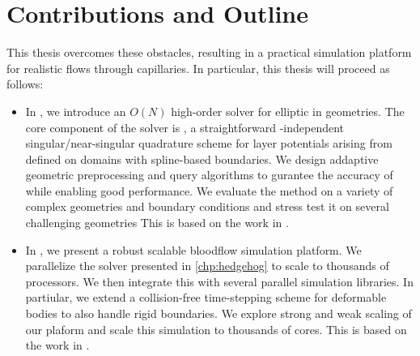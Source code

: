\section{Contributions and Outline}
This thesis overcomes these obstacles, resulting in a practical simulation platform for realistic \rbc flows through capillaries.
In particular, this thesis will proceed as follows:
\begin{itemize}
    \item In , we introduce an $O(N)$ high-order solver for elliptic \pdes in \threed geometries.
        The core component of the solver is \qbkix, a straightforward \pde-independent singular/near-singular quadrature scheme for layer potentials arising from \pdes defined on domains with spline-based boundaries.
        We design addaptive geometric preprocessing and query algorithms to gurantee the accuracy of \qbkix while enabling good performance. 
        We evaluate the method on a variety of complex geometries and boundary conditions and stress test it on several challenging geometries
        This is based on the work in \cite{morse2020robust}.
    \item In , we present a robust scalable bloodflow simulation platform. 
        We parallelize the \pde solver presented in \cref{chp:hedgehog} to scale to thousands of processors.
        We then integrate this with several parallel \rbc simulation libraries. 
        In partiular, we extend a collision-free time-stepping scheme for deformable bodies to also handle rigid boundaries.
        We explore strong and weak scaling of our plaform and scale this simulation to thousands of cores.
        This is based on the work in \cite{lu2019scalable}.
\end{itemize}
